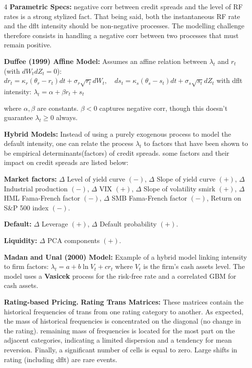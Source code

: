 \documentclass[landscape]{article}
\newcommand{\concept}[1]{\textcolor{conceptcolor}{\textbf{#1}}}
\begin{document}
\begin{multicols}{4}
\textcolor{subsubsectioncolor}{\textbf{Parametric Specs:}} negative corr between credit spreads and the level of RF rates is a strong stylized fact. That 
being said, both the instantaneous RF rate and the dflt intensity should be non-negative 
processes. The modelling challenge therefore consists in handling a negative corr between 
two processes that must remain positive.

\textbf{Duffee (1999) Affine Model:} Assumes an affine relation between $\lambda_t$ and $r_t$ (with $dW_t dZ_t = 0$): $dr_t = \kappa_r(\theta_r - r_t)dt + \sigma_r\sqrt{r_t}dW_t, \quad ds_t = \kappa_s(\theta_s - s_t)dt + \sigma_s\sqrt{s_t}dZ_t$ with dflt intensity: $\lambda_t = \alpha + \beta r_t + s_t$

where $\alpha, \beta$ are constants. $\beta < 0$ captures negative corr, though this doesn't guarantee $\lambda_t \geq 0$ always.

\textcolor{subsubsectioncolor}{\textbf{Hybrid Models:}} Instead of using a purely exogenous process to model the default intensity, one can relate the 
process $\lambda_t$ to factors that have been shown to be empirical determinants(factors) of credit spreads. some factors and their impact on credit spreads are listed below:

\noindent\textbf{Market factors:} $\Delta$ Level of yield curve $(-)$, $\Delta$ Slope of yield curve $(+)$, $\Delta$ Industrial production $(-)$, $\Delta$ VIX $(+)$, $\Delta$ Slope of volatility smirk $(+)$, $\Delta$ HML Fama-French factor $(-)$, $\Delta$ SMB Fama-French factor $(-)$, Return on S\&P 500 index $(-)$.

\noindent\textbf{Default:} $\Delta$ Leverage $(+)$, $\Delta$ Default probability $(+)$.

\noindent\textbf{Liquidity:} $\Delta$ PCA components $(+)$.

\textbf{Madan and Unal (2000) Model:} Example of a hybrid model linking intensity to firm factors: $\lambda_t = a + b\ln V_t + cr_t$
where $V_t$ is the firm's cash assets level. The model uses a \concept{Vasicek} process for the risk-free rate and a correlated GBM for cash assets.

\textcolor{subsectioncolor}{\textbf{Rating-based Pricing.}}
\textcolor{subsubsectioncolor}{\textbf{Rating Trans Matrices:}} These matrices contain the historical frequencies of trans from one rating 
category to another. As expected, the mass of historical frequencies is concentrated on the diagonal (no change in the 
rating). remaining mass of frequencies is located for the most part on the 
adjacent categories, indicating a limited dispersion and a tendency for mean reversion. Finally, a 
significant number of cells is equal to zero. Large shifts in rating (including dflt) are rare events.


\end{multicols}
\end{document}
